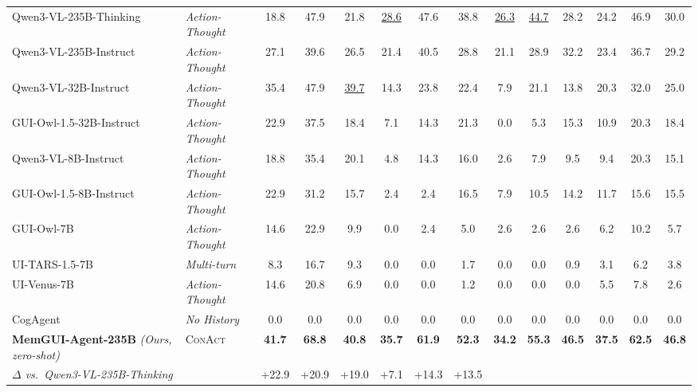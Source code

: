 \documentclass{llmxive}
\providecommand{\ourmethod}{MemGUI-Agent\xspace}
\providecommand{\conact}{\textsc{ConAct}\xspace}
\providecommand{\rise}[1]{#1}
\begin{document}
\begin{table}[t]
\begin{adjustbox}{max width=\textwidth}
\begin{tabular}{@{}ll | ccc | ccc | ccc | ccc@{}}
    \midrule
    Qwen3-VL-235B-Thinking~\cite{bai2025qwen3} & \textit{Action-Thought} & 18.8 & 47.9 & 21.8 & \underline{28.6} & 47.6 & 38.8 & \underline{26.3} & \underline{44.7} & 28.2 & 24.2 & 46.9 & 30.0 \\
    Qwen3-VL-235B-Instruct~\cite{bai2025qwen3} & \textit{Action-Thought} & 27.1 & 39.6 & 26.5 & 21.4 & 40.5 & 28.8 & 21.1 & 28.9 & 32.2 & 23.4 & 36.7 & 29.2 \\
    Qwen3-VL-32B-Instruct~\cite{bai2025qwen3} & \textit{Action-Thought} & 35.4 & 47.9 & \underline{39.7} & 14.3 & 23.8 & 22.4 & 7.9 & 21.1 & 13.8 & 20.3 & 32.0 & 25.0 \\
    GUI-Owl-1.5-32B-Instruct~\cite{xu2026mobile} & \textit{Action-Thought} & 22.9 & 37.5 & 18.4 & 7.1 & 14.3 & 21.3 & 0.0 & 5.3 & 15.3 & 10.9 & 20.3 & 18.4 \\
    Qwen3-VL-8B-Instruct~\cite{bai2025qwen3} & \textit{Action-Thought} & 18.8 & 35.4 & 20.1 & 4.8 & 14.3 & 16.0 & 2.6 & 7.9 & 9.5 & 9.4 & 20.3 & 15.1 \\
    GUI-Owl-1.5-8B-Instruct~\cite{xu2026mobile} & \textit{Action-Thought} & 22.9 & 31.2 & 15.7 & 2.4 & 2.4 & 16.5 & 7.9 & 10.5 & 14.2 & 11.7 & 15.6 & 15.5 \\
    GUI-Owl-7B~\cite{ye2025mobile} & \textit{Action-Thought} & 14.6 & 22.9 & 9.9 & 0.0 & 2.4 & 5.0 & 2.6 & 2.6 & 2.6 & 6.2 & 10.2 & 5.7 \\
    UI-TARS-1.5-7B~\cite{qin2025ui} & \textit{Multi-turn} & 8.3 & 16.7 & 9.3 & 0.0 & 0.0 & 1.7 & 0.0 & 0.0 & 0.9 & 3.1 & 6.2 & 3.8 \\
    UI-Venus-7B~\cite{gu2025ui-venus} & \textit{Action-Thought} & 14.6 & 20.8 & 6.9 & 0.0 & 0.0 & 1.2 & 0.0 & 0.0 & 0.0 & 5.5 & 7.8 & 2.6 \\
    CogAgent~\cite{hong2024cogagent} & \textit{No History} & 0.0 & 0.0 & 0.0 & 0.0 & 0.0 & 0.0 & 0.0 & 0.0 & 0.0 & 0.0 & 0.0 & 0.0 \\
    \midrule
    \addlinespace[2pt]
    \rowcolor{oursrowcolor} \textbf{\ourmethod-235B} \textit{(Ours, zero-shot)} & \conact & \textbf{41.7} & \textbf{68.8} & \textbf{40.8} & \textbf{35.7} & \textbf{61.9} & \textbf{52.3} & \textbf{34.2} & \textbf{55.3} & \textbf{46.5} & \textbf{37.5} & \textbf{62.5} & \textbf{46.8} \\[-2pt]
    \multicolumn{2}{l|}{\quad\textit{\footnotesize $\Delta$ vs.\ Qwen3-VL-235B-Thinking}}
      & {\footnotesize\rise{+22.9}} & {\footnotesize\rise{+20.9}} & {\footnotesize\rise{+19.0}}
      & {\footnotesize\rise{+7.1}} & {\footnotesize\rise{+14.3}} & {\footnotesize\rise{+13.5}}

\end{tabular}
\end{adjustbox}
\end{table}
\end{document}
